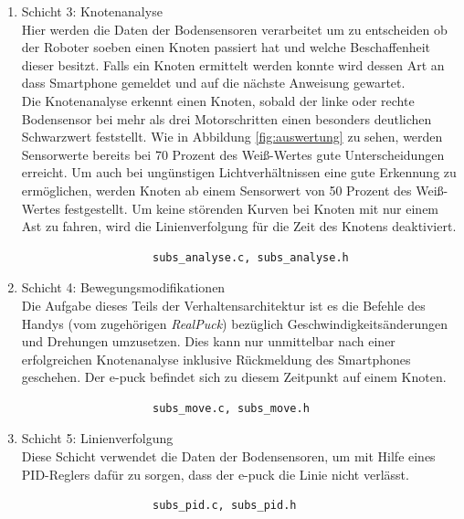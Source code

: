 \documentclass[10pt,a4paper]{article}
\begin{document}
\begin{enumerate}
				\item Schicht 3: Knotenanalyse \\
					Hier werden die Daten der Bodensensoren verarbeitet um zu entscheiden ob der Roboter soeben einen Knoten passiert hat und welche
					Beschaffenheit dieser besitzt. Falls ein Knoten ermittelt werden konnte wird dessen Art an dass Smartphone gemeldet und auf
					die nächste Anweisung gewartet.	\\
					Die Knotenanalyse erkennt einen Knoten, sobald der linke oder rechte Bodensensor bei mehr als drei Motorschritten einen besonders
					deutlichen Schwarzwert feststellt. Wie in Abbildung \ref{fig:auswertung} zu sehen, werden Sensorwerte bereits bei 70 Prozent des
					Weiß-Wertes gute Unterscheidungen erreicht. Um auch bei ungünstigen Lichtverhältnissen eine gute Erkennung zu ermöglichen,
					werden Knoten ab einem Sensorwert von 50 Prozent des Weiß-Wertes festgestellt. Um keine störenden Kurven bei Knoten mit nur einem
					Ast zu fahren, wird die Linienverfolgung für die Zeit des Knotens deaktiviert. 				

					\begin{verbatim}  
					subs_analyse.c, subs_analyse.h
					\end{verbatim}

				\item Schicht 4: Bewegungsmodifikationen \\
					Die Aufgabe dieses Teils der Verhaltensarchitektur ist es die Befehle des Handys (vom zugehörigen \textit{RealPuck}) bezüglich
					Geschwindigkeitsänderungen und Drehungen	 umzusetzen. Dies kann nur unmittelbar nach einer erfolgreichen Knotenanalyse
					inklusive Rückmeldung des Smartphones geschehen. Der e-puck befindet sich zu diesem Zeitpunkt auf einem Knoten.			

					\begin{verbatim}  
					subs_move.c, subs_move.h
					\end{verbatim}

  				\item Schicht 5: Linienverfolgung \\
					Diese Schicht verwendet die Daten der Bodensensoren, um mit Hilfe eines PID-Reglers dafür zu sorgen, dass der e-puck die Linie
					nicht verlässt. \\

					\begin{verbatim}
					subs_pid.c, subs_pid.h
					\end{verbatim}

  			\end{enumerate}
\end{document}
